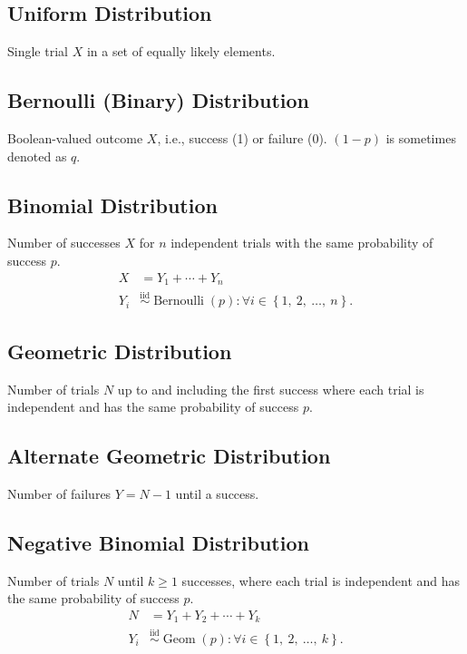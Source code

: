 \documentclass{article}
\begin{document}
\hfill%
\begin{minipage}{62.39259259mm}
    \subsection{Uniform Distribution}
    Single trial \(X\) in a set of equally likely elements.
    \subsection{Bernoulli (Binary) Distribution}
    Boolean-valued outcome \(X\), i.e., success (1) or failure (0).
    \(\left( 1 - p \right)\) is sometimes denoted as \(q\).
    \subsection{Binomial Distribution}
    Number of successes \(X\) for \(n\) independent trials with the
    same probability of success \(p\).
    \begin{align*}
        X   & = Y_1 + \cdots + Y_n                                                                                                           \\
        Y_i & \overset{\mathrm{iid}}{\sim} \operatorname{Bernoulli}{\left( p \right)} : \forall i \in \left\{ 1,\: 2,\: \dots,\: n \right\}.
    \end{align*}
    \subsection{Geometric Distribution}
    Number of trials \(N\) up to and including the first success where
    each trial is independent and has the same probability of success
    \(p\).
    \subsection{Alternate Geometric Distribution}
    Number of failures \(Y = N - 1\) until a success.
    \subsection{Negative Binomial Distribution}
    Number of trials \(N\) until \(k \geq 1\) successes, where each
    trial is independent and has the same probability of success \(p\).
    \begin{align*}
        N   & = Y_1 + Y_2 + \cdots + Y_k                                                                                                \\
        Y_i & \overset{\mathrm{iid}}{\sim} \operatorname{Geom}{\left( p \right)} : \forall i \in \left\{ 1,\: 2,\: \dots,\: k \right\}.
    \end{align*}

\end{minipage}
\end{document}
